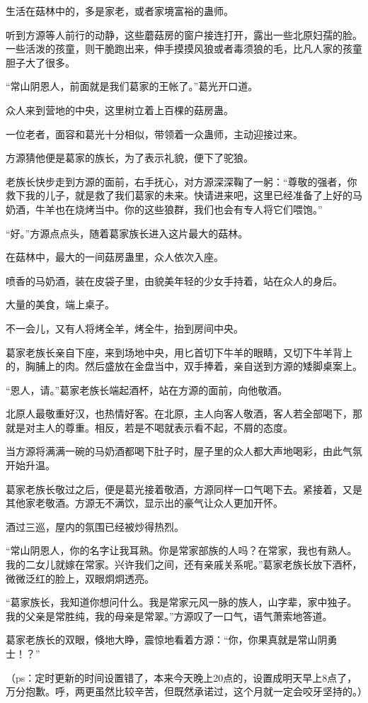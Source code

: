\begin{this_body}
生活在菇林中的，多是家老，或者家境富裕的蛊师。

听到方源等人前行的动静，这些蘑菇房的窗户接连打开，露出一些北原妇孺的脸。一些活泼的孩童，则干脆跑出来，伸手摸摸风狼或者毒须狼的毛，比凡人家的孩童胆子大了很多。

“常山阴恩人，前面就是我们葛家的王帐了。”葛光开口道。

众人来到营地的中央，这里树立着上百棵的菇房蛊。

一位老者，面容和葛光十分相似，带领着一众蛊师，主动迎接过来。

方源猜他便是葛家的族长，为了表示礼貌，便下了驼狼。

老族长快步走到方源的面前，右手抚心，对方源深深鞠了一躬：“尊敬的强者，你救下我的儿子，就是救了我们葛家的未来。快请进来吧，这里已经准备了上好的马奶酒，牛羊也在烧烤当中。你的这些狼群，我们也会有专人将它们喂饱。”

“好。”方源点点头，随着葛家族长进入这片最大的菇林。

在菇林中，最大的一间菇房蛊里，众人依次入座。

喷香的马奶酒，装在皮袋子里，由貌美年轻的少女手持着，站在众人的身后。

大量的美食，端上桌子。

不一会儿，又有人将烤全羊，烤全牛，抬到房间中央。

葛家老族长亲自下座，来到场地中央，用匕首切下牛羊的眼睛，又切下牛羊背上的，胸脯上的肉。然后盛放在金盘当中，双手捧着，亲自送到方源的矮脚桌案上。

“恩人，请。”葛家老族长端起酒杯，站在方源的面前，向他敬酒。

北原人最敬重好汉，也热情好客。在北原，主人向客人敬酒，客人若全部喝下，那就是对主人的尊重。相反，若是不喝就表示看不起，不屑的态度。

当方源将满满一碗的马奶酒都喝下肚子时，屋子里的众人都大声地喝彩，由此气氛开始升温。

葛家老族长敬过之后，便是葛光接着敬酒，方源同样一口气喝下去。紧接着，又是其他家老敬酒。方源无不满饮，显示出的豪气让众人更加开怀。

酒过三巡，屋内的氛围已经被炒得热烈。

“常山阴恩人，你的名字让我耳熟。你是常家部族的人吗？在常家，我也有熟人。我的二女儿就嫁在常家。兴许我们之间，还有亲戚关系呢。”葛家老族长放下酒杯，微微泛红的脸上，双眼炯炯透亮。

“葛家族长，我知道你想问什么。我是常家元风一脉的族人，山字辈，家中独子。我的父亲是常胜纯，我的母亲是常翠。”方源叹了一口气，语气萧索地答道。

葛家老族长的双眼，倏地大睁，震惊地看着方源：“你，你果真就是常山阴勇士！？”

（ps：定时更新的时间设置错了，本来今天晚上20点的，设置成明天早上8点了，万分抱歉。呼，两更虽然比较辛苦，但既然承诺过，这个月就一定会咬牙坚持的。）

\end{this_body}

